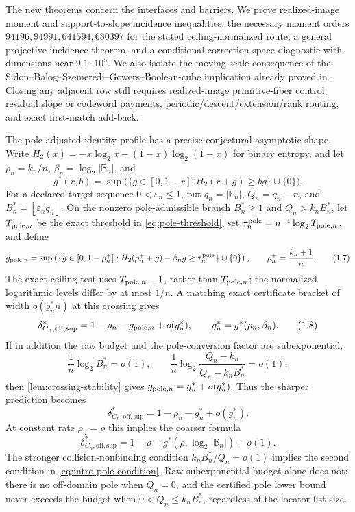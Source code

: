 \documentclass[a4paper,11pt]{amsart}
\theoremstyle{remark}
\newcommand{\F}{\mathbb F}
\newcommand{\B}{\mathbb B}
\newcommand{\abs}[1]{\lvert#1\rvert}
\newcommand{\floor}[1]{\left\lfloor#1\right\rfloor}
\begin{document}
The new theorems concern the interfaces and barriers.  We prove
realized-image moment and support-to-slope incidence inequalities, the
necessary moment orders \(94196,94991,641594,680397\) for the stated
ceiling-normalized route, a general projective incidence theorem, and a
conditional correction-space diagnostic with dimensions near
\(9.1\cdot10^5\).  We also isolate the moving-scale consequence of the
Sidon--Balog--Szemer\'edi--Gowers--Boolean-cube implication already proved in
\cite[Section~10]{ChoShortening}.  Closing any adjacent row still requires
realized-image primitive-fiber control, residual slope or codeword payments,
periodic/descent/extension/rank routing, and exact first-match add-back.

The pole-adjusted identity profile has a precise conjectural asymptotic shape.  Write
\(H_2(x)=-x\log_2x-(1-x)\log_2(1-x)\) for binary entropy, and let
\(\rho_n=k_n/n\), \(\beta_n=\log_2\abs{\B_n}\), and
\[
 g^*(r,b)=\sup\bigl(\{g\in[0,1-r]:H_2(r+g)\ge bg\}\cup\{0\}\bigr).
                                                               \tag{1.6}\label{eq:intro-gstar}
\]
For a declared target sequence \(0<\varepsilon_n\le1\), put
\(q_n=\abs{\F_n}\), \(Q_n=q_n-n\), and
\(B_n^*=\floor{\varepsilon_nq_n}\).  On the nonzero pole-admissible branch
\(B_n^*\ge1\) and \(Q_n>k_nB_n^*\), let \(T_{{\rm pole},n}\) be the exact threshold in
\eqref{eq:pole-threshold}, set
\(\tau_n^{\rm pole}=n^{-1}\log_2T_{{\rm pole},n}\), and define
\[
 g_{{\rm pole},n}=\sup\left(
 \left\{g\in[0,1-\rho_n^+]:
 H_2(\rho_n^++g)-\beta_ng\ge\tau_n^{\rm pole}\right\}\cup\{0\}
 \right),\qquad \rho_n^+=\frac{k_n+1}{n}.          \tag{1.7}\label{eq:intro-pole-crossing}
\]
The exact ceiling test uses \(T_{{\rm pole},n}-1\), rather than
\(T_{{\rm pole},n}\); the normalized logarithmic levels differ by at most
\(1/n\).  A matching exact certificate bracket of width \(o(g_n^*n)\) at
this crossing gives
\[
 \delta_{C_n,\mathrm{off,sup}}^*
 =1-\rho_n-g_{{\rm pole},n}+o(g_n^*),\qquad
 g_n^*=g^*(\rho_n,\beta_n).                        \tag{1.8}\label{eq:intro-pole-prediction}
\]
If in addition the raw budget and the pole-conversion factor are
subexponential,
\[
 \frac1n\log_2B_n^*=o(1),\qquad
 \frac1n\log_2\frac{Q_n-k_n}{Q_n-k_nB_n^*}=o(1), \tag{1.9}\label{eq:intro-pole-condition}
\]
then \cref{lem:crossing-stability} gives
\(g_{{\rm pole},n}=g_n^*+o(g_n^*)\).  Thus the sharper prediction becomes
\[
 \delta_{C_n,\mathrm{off,sup}}^*
 =1-\rho_n-g_n^*+o(g_n^*).                        \tag{1.10}\label{eq:intro-sharp-prediction}
\]
At constant rate \(\rho_n=\rho\) this implies the coarser formula
\[
 \boxed{\displaystyle
 \delta_{C_n,\mathrm{off,sup}}^*
 =1-\rho-g^*(\rho,\log_2\abs{\B_n})+o(1)}.
                                                               \tag{1.11}\label{eq:intro-coarse-prediction}
\]
The stronger collision-nonbinding condition
\(k_nB_n^*/Q_n=o(1)\) implies the second condition in
\eqref{eq:intro-pole-condition}.  Raw subexponential budget alone does not:
there is no off-domain pole when \(Q_n=0\), and the certified pole lower
bound never exceeds the budget when \(0<Q_n\le k_nB_n^*\), regardless of
the locator-list size.
\end{document}
